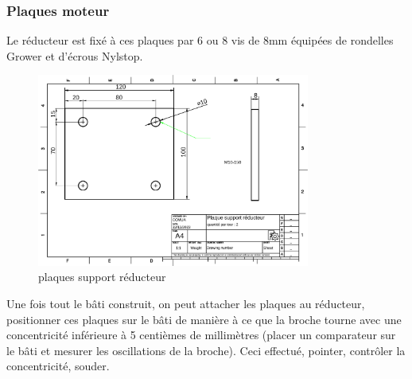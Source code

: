 \documentclass[a4paper]{article}
\begin{document}
\subsubsection{Plaques moteur}
Le réducteur est fixé à ces plaques par 6 ou 8 vis de 8mm équipées de rondelles Grower et d'écrous Nylstop.
\begin{figure}[H]
    \centering
    \includegraphics*[width=0.8\textwidth]{../plans/plaques}
    \caption{plaques support réducteur}
    \label{fig:plaques}
\end{figure}
Une fois tout le bâti construit, on peut attacher les plaques au réducteur, positionner ces plaques sur le bâti de manière à ce que la broche
tourne avec une concentricité inférieure à 5 centièmes de millimètres (placer un comparateur sur le bâti et mesurer les oscillations de la broche). 
Ceci effectué, pointer, contrôler la concentricité, souder. 
\end{document}
